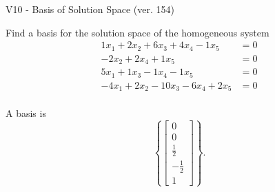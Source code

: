 \begin{exercise}
  \begin{exerciseTitle}V10 - Basis of Solution Space (ver. 154)\end{exerciseTitle}
  \begin{exerciseStatement}
    Find a basis for the solution space of the homogeneous system 
\begin{align*}
 1 x_ 1 + 2 x_ 2 + 6 x_ 3 + 4 x_ 4 -1 x_ 5 &= 0  \\ 
  -2 x_ 2 + 2 x_ 4 + 1 x_ 5 &= 0  \\ 
  5 x_ 1 + 1 x_ 3 -1 x_ 4 -1 x_ 5 &= 0  \\ 
  -4 x_ 1 + 2 x_ 2 -10 x_ 3 -6 x_ 4 + 2 x_ 5 &= 0  \\ 
 \end{align*}


 
  \end{exerciseStatement}

  \begin{exerciseAnswer}
   A basis is   
\[\left\{\left[\begin{array}{c}
0 \\
0 \\
\frac{1}{2} \\
-\frac{1}{2} \\
1
\end{array}\right]\right\}.\]

  


  \end{exerciseAnswer}
\end{exercise}
